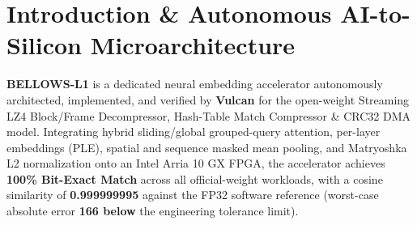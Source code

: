 \documentclass[11pt,a4paper]{article}
\begin{document}
\section{Introduction \& Autonomous AI-to-Silicon Microarchitecture}

\textbf{BELLOWS-L1} is a dedicated neural embedding accelerator autonomously architected, implemented, and verified by \textbf{Vulcan} for the open-weight Streaming LZ4 Block/\allowbreak{}Frame Decompressor,\allowbreak{} Hash-Table Match Compressor \& CRC32 DMA model. Integrating hybrid sliding/global grouped-query attention, per-layer embeddings (PLE), spatial and sequence masked mean pooling, and Matryoshka L2 normalization onto an Intel Arria 10 GX FPGA, the accelerator achieves \textbf{100\% Bit-Exact Match} across all official-weight workloads, with a cosine similarity of \textbf{0.999999995} against the FP32 software reference (worst-case absolute error \textbf{166\texttimes{} below} the engineering tolerance limit).

\vspace{2pt}
\end{document}
